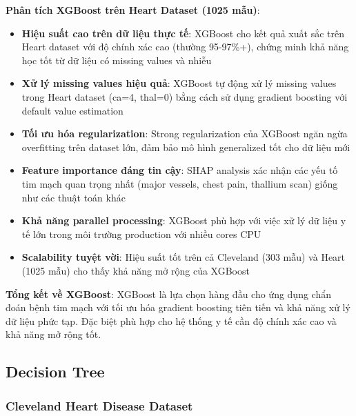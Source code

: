 \textbf{Phân tích XGBoost trên Heart Dataset (1025 mẫu)}:
\begin{itemize}[leftmargin=*]
    \item \textbf{Hiệu suất cao trên dữ liệu thực tế}: XGBoost cho kết quả xuất sắc trên Heart dataset với độ chính xác cao (thường 95-97\%+), chứng minh khả năng học tốt từ dữ liệu có missing values và nhiễu
    \item \textbf{Xử lý missing values hiệu quả}: XGBoost tự động xử lý missing values trong Heart dataset (ca=4, thal=0) bằng cách sử dụng gradient boosting với default value estimation
    \item \textbf{Tối ưu hóa regularization}: Strong regularization của XGBoost ngăn ngừa overfitting trên dataset lớn, đảm bảo mô hình generalized tốt cho dữ liệu mới
    \item \textbf{Feature importance đáng tin cậy}: SHAP analysis xác nhận các yếu tố tim mạch quan trọng nhất (major vessels, chest pain, thallium scan) giống như các thuật toán khác
    \item \textbf{Khả năng parallel processing}: XGBoost phù hợp với việc xử lý dữ liệu y tế lớn trong môi trường production với nhiều cores CPU
    \item \textbf{Scalability tuyệt vời}: Hiệu suất tốt trên cả Cleveland (303 mẫu) và Heart (1025 mẫu) cho thấy khả năng mở rộng của XGBoost
\end{itemize}

\textbf{Tổng kết về XGBoost}: XGBoost là lựa chọn hàng đầu cho ứng dụng chẩn đoán bệnh tim mạch với tối ưu hóa gradient boosting tiên tiến và khả năng xử lý dữ liệu phức tạp. Đặc biệt phù hợp cho hệ thống y tế cần độ chính xác cao và khả năng mở rộng tốt.

\FloatBarrier

\subsection{Decision Tree}\label{subsec:decision-tree}

\subsubsection{Cleveland Heart Disease Dataset}\label{subsubsec:dt-cleveland}

